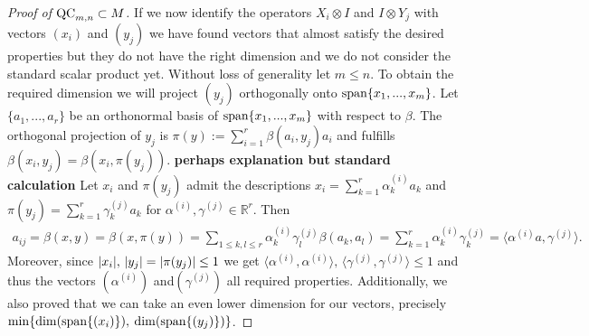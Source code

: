 \begin{proof}[Proof of $ \textup{QC}_{m,n} \subset M $]
	If we now identify the operators $ X_i \otimes I $ and $  I \otimes Y_j$ with vectors
	$ (x_i) $ and $ (y_j) $ we have found vectors that almost satisfy the desired properties but they do not have the right dimension and we do not consider the standard scalar product yet. Without loss of generality let $ m \le n $. To obtain the required dimension we will project $ (y_j) $ orthogonally onto $ \textup{span}\{ x_1,...,x_m \} $.
	Let $ \{a_1,...,a_r\} $ be an orthonormal basis of $ \textup{span} \{ x_1,...,x_m \} $ with respect to $ \beta $. 
	The orthogonal projection of $ y_j $ is $ \pi(y):= \sum_{i=1}^{r}\beta(a_i,y_j)a_i $ and fulfills
	$ \beta(x_i,y_j) = \beta(x_i,\pi(y_j)) $. \textbf{perhaps explanation but standard calculation}
	Let $ x_i $ and $ \pi(y_j) $ admit the descriptions 
	$ x_i = \sum_{k=1}^{r}\alpha_k^{(i)}a_k$ and $  \pi(y_j) = \sum_{k=1}^r \gamma_k^{(j)} a_k$ for $ \alpha^{(i)}, \gamma^{(j)} \in \mathbb{R}^r $. Then
	\begin{align*}
		a_{ij}= \beta(x,y)= \beta(x,\pi(y)) = \sum_{1 \le k,l \le r} \alpha_k^{(i)} \gamma_l^{(j)} \beta(a_k,a_l) = \sum_{k=1}^{r}\alpha_k^{(i)}\gamma_k^{(j)} = \langle \alpha^{(i)}a, \gamma^{(j)} \rangle.
	\end{align*}
	Moreover, since $ {\left|{x_i}\right|}, \, {\left|{y_j}\right|}= {\left|{\pi(y_j)}\right|} \le 1 $ we get $ \langle \alpha^{(i)}, \alpha^{(i)} \rangle, \, \langle \gamma^{(j)}, \gamma^{(j)} \rangle \le 1$ and thus the vectors $ (\alpha^{(i)}) $ and$ (\gamma^{(j)}) $ all required properties. 
	Additionally, we also proved that we can take an even lower dimension for our vectors, precisely 
	$ \min \{ \dim( \textup{span} \{ (x_i) \}),$ $ \dim(\textup{span} \{ (y_j) \} )\} $.
\end{proof}

